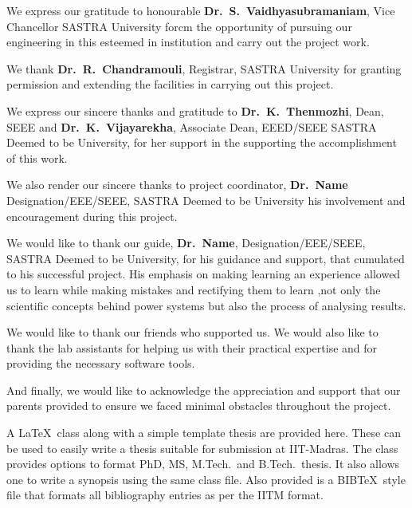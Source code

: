 \documentclass[a4paper, 12pt, oneside]{sastra}
\begin{document}
	\hspace*{12pt} We express our gratitude to honourable \textbf{Dr.~S.~Vaidhyasubramaniam}, Vice Chancellor SASTRA University forcm the opportunity of pursuing our engineering in this esteemed in institution and carry out the project work.
	
	\par We thank \textbf{Dr.~R.~Chandramouli}, Registrar, SASTRA University for granting permission and extending the facilities in carrying out this project.
	
	\par We express our sincere thanks and gratitude to \textbf{Dr.~K.~Thenmozhi}, Dean, SEEE and \textbf{Dr.~K.~Vijayarekha}, Associate Dean, EEED/SEEE SASTRA Deemed to be University, for her support in the supporting the accomplishment of this work.
	
	\par We also render our sincere thanks to project coordinator, \textbf{Dr.~Name} Designation/EEE/SEEE, SASTRA Deemed to be University his involvement and encouragement during this project.

\par We would like to thank our guide, \textbf{Dr.~Name}, Designation/EEE/SEEE, SASTRA Deemed to be University, for his guidance and support, that cumulated to his successful project. His emphasis on making learning an experience allowed us to learn while making mistakes and rectifying them to learn ,not only the scientific concepts behind power systems but also the process of analysing results.
	
	\par We would like to thank our friends who supported us. We would also like to thank the lab assistants for helping us with their practical expertise and for providing the necessary software tools.
	
	\par And finally, we would like to acknowledge the appreciation and support that our parents provided to ensure we faced minimal obstacles throughout the project.
	\pagebreak
	
	\abstract
	
	
	\vspace*{24pt}
	
	\noindent A \LaTeX\ class along with a simple template thesis are provided here.  These can be used to easily write a thesis suitable for submission at IIT-Madras.  The class provides options to format PhD, MS, M.Tech.\ and B.Tech.\ thesis.  It also allows one to write a synopsis using the same class file.  Also provided is a BIB\TeX\ style file that formats all bibliography entries as per the IITM format.
	
\end{document}
